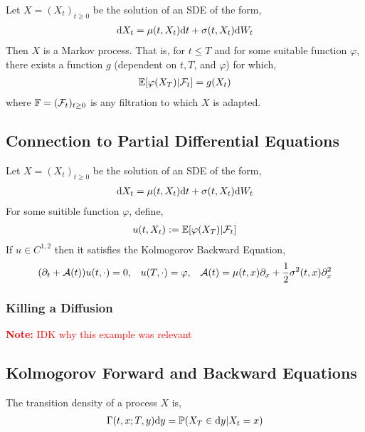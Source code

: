 \documentclass[12pt]{article}
\newcommand{\note}[1]{\textcolor{red}{\textbf{Note:} #1}}
\begin{document}
\begin{theorem}
Let \( X = (X_t)_{t\geq 0} \) be the solution of an SDE of the form,
\begin{align*}
    \mathrm{d} X_t = \mu(t,X_t)\mathrm{d} t + \sigma(t,X_t)\mathrm{d} W_t
\end{align*}
Then \( X \) is a Markov process. That is, for \( t\leq T \) and for some suitable function \( \varphi \), there exists a function \( g \) (dependent on \( t,T \), and \( \varphi \)) for which,
\begin{align*}
    \mathbb{E}[\varphi(X_T) | \mathcal{F}_t] = g(X_t)
\end{align*}
where \( \mathbb{F} = (\mathcal{F}_t)_{t\geq 0} \) is any filtration to which \( X \) is adapted.
\end{theorem}

\subsection{Connection to Partial Differential Equations}

\begin{theorem}
Let \( X = (X_t)_{t\geq 0} \) be the solution of an SDE of the form,
\begin{align*}
    \mathrm{d} X_t = \mu(t,X_t)\mathrm{d} t + \sigma(t,X_t)\mathrm{d} W_t
\end{align*}
For some suitible function \( \varphi \), define,
\begin{align*}
    u(t,X_t):= \mathbb{E}[\varphi(X_T)|\mathcal{F}_t]
\end{align*}
If \( u\in C^{1,2} \) then it satisfies the Kolmogorov Backward Equation,
\begin{align*}
    (\partial_t +\mathcal{A}(t)) u(t,\cdot) = 0, && u(T,\cdot) = \varphi, && \mathcal{A}(t) = \mu(t,x) \partial_x + \frac{1}{2}\sigma^2(t,x)\partial^2_x
\end{align*}

\end{theorem}

\subsubsection{Killing a Diffusion}
\note{IDK why this example was relevant}

\subsection{Kolmogorov Forward and Backward Equations}
\begin{definition}
The transition density of a process \( X \) is,
\begin{align*}
    \Gamma(t,x;T,y) \mathrm{d} y = \mathbb{P}(X_T\in\mathrm{d} y | X_t = x)
\end{align*}
\end{definition}
\end{document}
